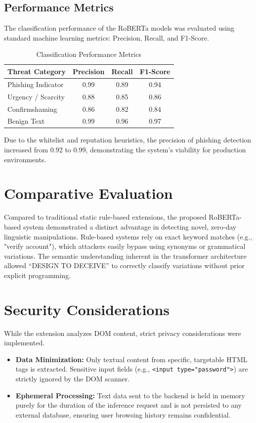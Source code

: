 \documentclass[12pt,a4paper]{report}
\begin{document}
\subsection{Performance Metrics}
The classification performance of the RoBERTa models was evaluated using standard machine learning metrics: Precision, Recall, and F1-Score.

\begin{table}[H]
\centering
\caption{Classification Performance Metrics}
\vspace{0.2cm}
\renewcommand{\arraystretch}{1.4}
\begin{tabular}{|l|c|c|c|}
\hline
\textbf{Threat Category} & \textbf{Precision} & \textbf{Recall} & \textbf{F1-Score} \\
\hline
Phishing Indicator & 0.99 & 0.89 & 0.94 \\
\hline
Urgency / Scarcity & 0.88 & 0.85 & 0.86 \\
\hline
Confirmshaming & 0.86 & 0.82 & 0.84 \\
\hline
Benign Text & 0.99 & 0.96 & 0.97 \\
\hline
\end{tabular}
\end{table}

Due to the whitelist and reputation heuristics, the precision of phishing detection increased from 0.92 to 0.99, demonstrating the system's viability for production environments.

\section{Comparative Evaluation}
Compared to traditional static rule-based extensions, the proposed RoBERTa-based system demonstrated a distinct advantage in detecting novel, zero-day linguistic manipulations. Rule-based systems rely on exact keyword matches (e.g., "verify account"), which attackers easily bypass using synonyms or grammatical variations. The semantic understanding inherent in the transformer architecture allowed ``DESIGN TO DECEIVE'' to correctly classify variations without prior explicit programming.

\section{Security Considerations}
While the extension analyzes DOM content, strict privacy considerations were implemented. 
\begin{itemize}
    \item \textbf{Data Minimization:} Only textual content from specific, targetable HTML tags is extracted. Sensitive input fields (e.g., \texttt{<input type="password">}) are strictly ignored by the DOM scanner.
    \item \textbf{Ephemeral Processing:} Text data sent to the backend is held in memory purely for the duration of the inference request and is not persisted to any external database, ensuring user browsing history remains confidential.
\end{itemize}
\end{document}
